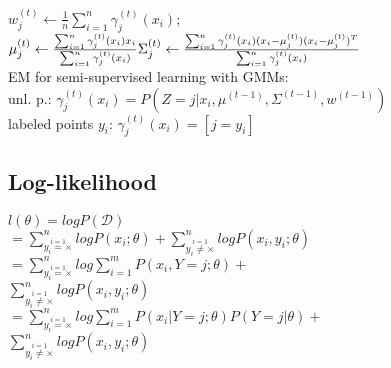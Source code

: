 $w_j^{(t)} \leftarrow \frac{1}{n} \sum_{i=1}^n \gamma_j^{(t)} (x_i)$;  %
$\mu_j^{(t)} \leftarrow \frac{\sum_{i=1}^n \gamma_j^{(t)} (x_i) x_i}{\sum_{i=1}^n \gamma_j^{(t)} (x_i)}\\ %
\Sigma_j^{(t)} \leftarrow \frac{\sum_{i=1}^n \gamma_j^{(t)}(x_i) (x_i - \mu_j^{(t)}) (x_i - \mu_j^{(t)})^T}{\sum_{i=1}^n \gamma_j^{(t)}(x_i)}$\\ %
EM for semi-supervised learning with GMMs:\\
unl. p.: $\gamma_j^{(t)}(x_i) = P(Z=j|x_i, \mu^{(t-1)}, \Sigma^{(t-1)}, w^{(t-1)})$\\
labeled points $y_i$: $\gamma_j^{(t)}(x_i) = [j = y_i]$



\subsection*{Log-likelihood}
$l(\theta) = log P(\mathcal{D})$ \\
$=\sum_{\overset{i=1}{y_i=\times}}^n log P(x_i;\theta) + \sum_{\overset{i=1}{y_i\not=\times}}^n log P(x_i,y_i;\theta)$\\
$=\sum_{\overset{i=1}{y_i=\times}}^n log \sum_{i=1}^m P(x_i, Y=j;\theta) +$\\
$ \sum_{\overset{i=1}{y_i\not=\times}}^n log P(x_i,y_i;\theta)$\\
$=\sum_{\overset{i=1}{y_i=\times}}^n log \sum_{i=1}^m P(x_i|Y=j;\theta)P(Y=j|\theta) +$\\
$ \sum_{\overset{i=1}{y_i\not=\times}}^n log P(x_i,y_i;\theta)$

